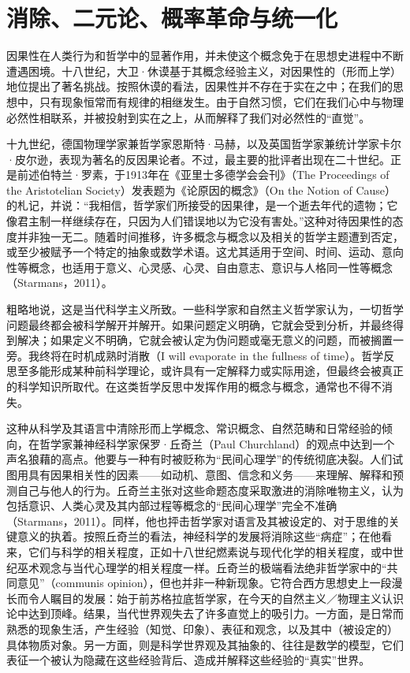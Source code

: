 \section{消除、二元论、概率革命与统一化}

因果性在人类行为和哲学中的显著作用，并未使这个概念免于在思想史进程中不断遭遇困境。十八世纪，大卫·休谟基于其概念经验主义，对因果性的（形而上学）地位提出了著名挑战。按照休谟的看法，因果性并不存在于实在之中；在我们的思想中，只有现象恒常而有规律的相继发生。由于自然习惯，它们在我们心中与物理必然性相联系，并被投射到实在之上，从而解释了我们对必然性的“直觉”。

十九世纪，德国物理学家兼哲学家恩斯特·马赫，以及英国哲学家兼统计学家卡尔·皮尔逊，表现为著名的反因果论者。不过，最主要的批评者出现在二十世纪。正是前述伯特兰·罗素，于1913年在《亚里士多德学会会刊》（The Proceedings of the Aristotelian Society）发表题为《论原因的概念》（On the Notion of Cause）的札记，并说：“我相信，哲学家们所接受的因果律，是一个逝去年代的遗物；它像君主制一样继续存在，只因为人们错误地以为它没有害处。”这种对待因果性的态度并非独一无二。随着时间推移，许多概念与概念以及相关的哲学主题遭到否定，或至少被赋予一个特定的抽象或数学术语。这尤其适用于空间、时间、运动、意向性等概念，也适用于意义、心灵感、心灵、自由意志、意识与人格同一性等概念（Starmans，2011）。

粗略地说，这是当代科学主义所致。一些科学家和自然主义哲学家认为，一切哲学问题最终都会被科学解开并解开。如果问题定义明确，它就会受到分析，并最终得到解决；如果定义不明确，它就会被认定为伪问题或毫无意义的问题，而被搁置一旁。我终将在时机成熟时消散（I will evaporate in the fullness of time）。哲学反思至多能形成某种前科学理论，或许具有一定解释力或实际用途，但最终会被真正的科学知识所取代。在这类哲学反思中发挥作用的概念与概念，通常也不得不消失。

这种从科学及其语言中清除形而上学概念、常识概念、自然范畴和日常经验的倾向，在哲学家兼神经科学家保罗·丘奇兰（Paul Churchland）的观点中达到一个声名狼藉的高点。他要与一种有时被贬称为“民间心理学”的传统彻底决裂。人们试图用具有因果相关性的因素——如动机、意图、信念和义务——来理解、解释和预测自己与他人的行为。丘奇兰主张对这些命题态度采取激进的消除唯物主义，认为包括意识、人类心灵及其内部过程等概念的“民间心理学”完全不准确（Starmans，2011）。同样，他也抨击哲学家对语言及其被设定的、对于思维的关键意义的执着。按照丘奇兰的看法，神经科学的发展将消除这些“病症”；在他看来，它们与科学的相关程度，正如十八世纪燃素说与现代化学的相关程度，或中世纪巫术观念与当代心理学的相关程度一样。丘奇兰的极端看法绝非哲学家中的“共同意见”（communis opinion），但也并非一种新现象。它符合西方思想史上一段漫长而令人瞩目的发展：始于前苏格拉底哲学家，在今天的自然主义／物理主义认识论中达到顶峰。结果，当代世界观失去了许多直觉上的吸引力。一方面，是日常而熟悉的现象生活，产生经验（知觉、印象）、表征和观念，以及其中（被设定的）具体物质对象。另一方面，则是科学世界观及其抽象的、往往是数学的模型，它们表征一个被认为隐藏在这些经验背后、造成并解释这些经验的“真实”世界。

